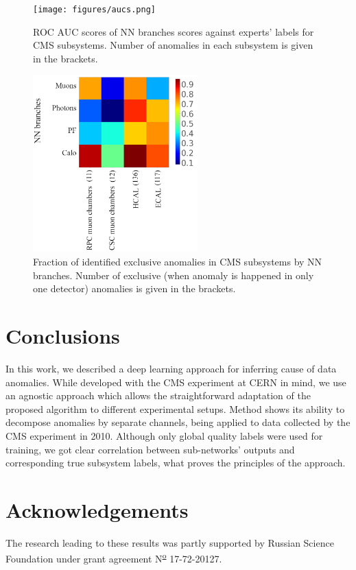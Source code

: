 \documentclass[a4paper]{jpconf}
\begin{document}
\begin{figure}[H]
\begin{center}
\texttt{[image: figures/aucs.png]}
\end{center}
\caption{\label{fig:matrix}ROC AUC scores of NN branches scores against experts' labels for CMS subsystems. Number of anomalies in each subsystem is given in the brackets.}
\end{figure}


\begin{figure}[H]
\begin{center}
\includegraphics[width=2.5in]{figures/exclusive.png}
\end{center}
\caption{\label{fig:exc}Fraction of identified exclusive anomalies in CMS subsystems by NN branches. Number of exclusive (when anomaly is happened in only one detector) anomalies is given in the brackets.}
\end{figure}

\section{Conclusions}
In this work, we described a deep learning approach for inferring cause of data anomalies. While developed
with the CMS experiment at CERN in mind, we use an agnostic approach which allows the straightforward
adaptation of the proposed algorithm to different experimental setups. Method shows its ability to decompose anomalies by separate channels, being applied to data collected by the CMS experiment in 2010. Although only global quality labels were used for training, we got clear correlation between sub-networks’ outputs and corresponding true subsystem labels, what proves the principles of the approach.

\section*{Acknowledgements}
The research leading to these results was partly supported by Russian Science Foundation under grant agreement N\textsuperscript{\underline{\scriptsize o}} 17-72-20127.
\end{document}
